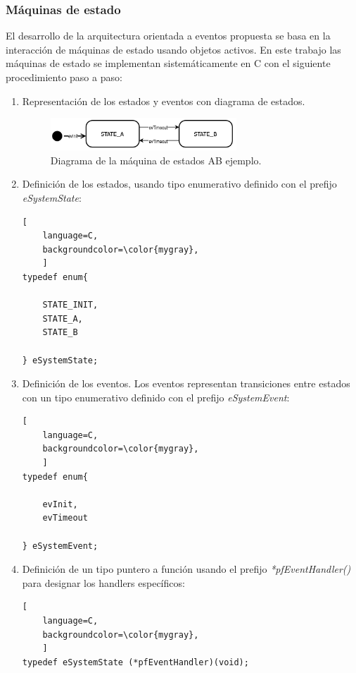 \subsubsection{Máquinas de estado}
El desarrollo de la arquitectura orientada a eventos propuesta se basa en la interacción de máquinas de estado usando objetos activos. En este trabajo las máquinas de estado se implementan sistemáticamente en C con el siguiente procedimiento paso a paso:

\begin{enumerate}
\item Representación de los estados y eventos con diagrama de estados.
\begin{figure}[ht]
	\centering
	\includegraphics[width=0.66\textwidth]{./Figures/statemachineAB.png}
	\caption{Diagrama de la máquina de estados AB ejemplo.}
	\label{fig:fsmAB}
\end{figure}

\item Definición de los estados, usando tipo enumerativo definido con el prefijo \textit{eSystemState}:

\begin{lstlisting}[
	language=C, 
	backgroundcolor=\color{mygray},
	]
typedef enum{
    
    STATE_INIT,
	STATE_A,
	STATE_B

} eSystemState;
\end{lstlisting}

\item Definición de los eventos. Los eventos representan transiciones entre estados con un tipo enumerativo definido con el prefijo \textit{eSystemEvent}:

\begin{lstlisting}[
	language=C, 
	backgroundcolor=\color{mygray},
	]
typedef enum{

	evInit,
	evTimeout

} eSystemEvent;
\end{lstlisting}

\item Definición de un tipo puntero a función usando el prefijo \textit{*pfEventHandler()} para designar los handlers específicos:

\begin{lstlisting}[
	language=C, 
	backgroundcolor=\color{mygray},
	]
typedef eSystemState (*pfEventHandler)(void);
\end{lstlisting}


\end{enumerate}
